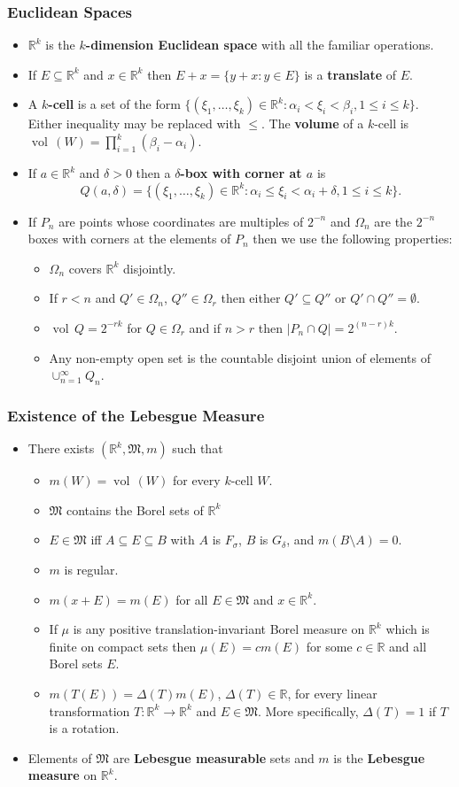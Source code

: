 \documentclass{article}
\newcounter{topicnumber}[section]
\newcommand{\steptopic}[1][1]{\addtocounter{topicnumber}{#1}}
\newenvironment{topic}[1]{%
\steptopic%
\subsubsection{#1}%
\begin{itemize}%
}{%
\end{itemize}%
}
\newcommand{\term}[1]{{\bf #1}}
\newcommand{\remark}{\item}
\DeclareMathOperator{\vol}{vol\,}
\begin{document}
\begin{topic}{Euclidean Spaces}
\remark $\mathbb{R}^k$ is the \term{$k$-dimension Euclidean space} with all the familiar operations.
\remark If $E \subseteq \mathbb{R}^k$ and $x \in \mathbb{R}^k$ then $E + x = \{ y + x : y \in E \}$ is a \term{translate} of $E$.
\remark A \term{$k$-cell} is a set of the form $\{ (\xi_1, \ldots, \xi_k) \in \mathbb{R}^k : \alpha_i < \xi_i < \beta_i, 1 \leq i \leq k \}$. Either inequality may be replaced with $\leq$. The \term{volume} of a $k$-cell is $\vol(W) = \prod_{i=1}^k (\beta_i - \alpha_i)$.
\remark If $a \in \mathbb{R}^k$ and $\delta > 0$ then a \term{$\delta$-box with corner at $a$} is $$Q(a, \delta) = \{ (\xi_1, \ldots, \xi_k) \in \mathbb{R}^k : \alpha_i \leq \xi_i < \alpha_i + \delta, 1 \leq i \leq k \}.$$
\remark If $P_n$ are points whose coordinates are multiples of $2^{-n}$ and $\Omega_n$ are the $2^{-n}$ boxes with corners at the elements of $P_n$ then we use the following properties:
\begin{itemize}
\item $\Omega_n$ covers $\mathbb{R}^k$ disjointly.
\item If $r < n$ and $Q' \in \Omega_n$, $Q'' \in \Omega_r$ then either $Q' \subseteq Q''$ or $Q' \cap Q'' = \emptyset$.
\item $\vol{Q} = 2^{-rk}$ for $Q \in \Omega_r$ and if $n > r$ then $|P_n \cap Q| = 2^{(n-r)k}$.
\item Any non-empty open set is the countable disjoint union of elements of $\cup_{n=1}^\infty Q_n$.
\end{itemize}
\end{topic}

\begin{topic}{Existence of the Lebesgue Measure}
\remark There exists $(\mathbb{R}^k, \mathfrak{M}, m)$ such that
\begin{itemize}
\item $m(W) = \vol(W)$ for every $k$-cell $W$.
\item $\mathfrak{M}$ contains the Borel sets of $\mathbb{R}^k$
\item $E \in \mathfrak{M}$ iff $A \subseteq E \subseteq B$ with $A$ is $F_\sigma$, $B$ is $G_\delta$, and $m(B \setminus A) = 0$.
\item $m$ is regular.
\item $m(x + E) = m(E)$ for all $E \in \mathfrak{M}$ and $x \in \mathbb{R}^k$.
\item If $\mu$ is any positive translation-invariant Borel measure on $\mathbb{R}^k$ which is finite on compact sets then $\mu(E) = cm(E)$ for some $c \in \mathbb{R}$ and all Borel sets $E$.
\item $m(T(E)) = \Delta(T)m(E)$, $\Delta(T) \in \mathbb{R}$, for every linear transformation $T : \mathbb{R}^k \to \mathbb{R}^k$ and $E \in \mathfrak{M}$. More specifically, $\Delta(T) = 1$ if $T$ is a rotation.
\end{itemize}
\remark Elements of $\mathfrak{M}$ are \term{Lebesgue measurable} sets and $m$ is the \term{Lebesgue measure} on $\mathbb{R}^k$.
\end{topic}
\end{document}
